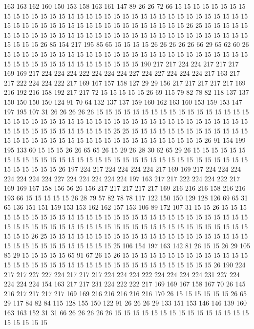 163 163 162 160 150 153 158 163 161 147 89 26 26 72 66 15 15 15 15 15
15 15 15 15 15 15 15 15 15 15 15 15 15 15 15 15 15 15 15 15
15 15 15 15 15 15 15 15 15 15 15 15 15 15 15 15 15 15 15 15
15 15 15 15 15 15 15 15 15 15 26 25 15 15 15 15 15 15 15 15
15 15 15 15 15 15 15 15 15 15 15 15 15 15 15 15 15 15 15 15
15 15 15 15 15 15 15 15 26 85 154 217 195 85 65 15 15 15 15 26
26 26 26 26 66 29 65 62 60 26 15 15 15 15 15 15 15 15 15 15
15 15 15 15 15 15 15 15 15 15 15 15 15 15 15 15 15 15 15 15
15 15 15 15 15 15 15 15 15 15 15 15 190 217 217 224 224 217 217 217
169 169 217 224 224 224 222 224 224 224 227 224 227 224 224 224 217 163 217 217
222 224 224 222 217 169 167 157 158 127 29 29 156 217 217 217 217 217 169 216
192 216 158 192 217 217 72 15 15 15 15 15 26 69 115 79 82 78 82 118
137 137 150 150 150 150 124 91 70 64 132 137 137 159 160 162 163 160 153 159
153 147 197 195 107 31 26 26 26 26 26 15 15 15 15 15 15 15 15 15
15 15 15 15 15 15 15 15 15 15 15 15 15 15 15 15 15 15 15 15
15 15 15 15 15 15 15 15 15 15 15 15 15 15 15 15 15 15 15 15
15 15 15 15 15 15 15 25 25 15 15 15 15 15 15 15 15 15 15 15
15 15 15 15 15 15 15 15 15 15 15 15 15 15 15 15 15 15 15 15
15 15 15 15 26 91 154 199 195 133 60 15 15 15 26 26 65 65 26 15
29 26 28 30 62 65 29 26 15 15 15 15 15 15 15 15 15 15 15 15
15 15 15 15 15 15 15 15 15 15 15 15 15 15 15 15 15 15 15 15
15 15 15 15 15 15 15 26 197 224 217 224 224 224 224 217 169 169 217 224
224 224 224 224 224 224 227 224 224 224 224 224 197 163 217 217 222 224 224 222
217 169 169 167 158 156 56 26 156 217 217 217 217 217 169 216 216 216 158 216
216 193 66 15 15 15 15 15 26 28 79 57 82 78 78 117 122 150 150 129
128 126 69 65 31 65 136 151 151 159 153 153 162 162 157 153 106 89 172 107
31 15 15 26 15 15 15 15 15 15 15 15 15 15 15 15 15 15 15 15
15 15 15 15 15 15 15 15 15 15 15 15 15 15 15 15 15 15 15 15
15 15 15 15 15 15 15 15 15 15 15 15 15 15 15 15 15 15 15 15
15 15 15 15 26 25 15 15 15 15 15 15 15 15 15 15 15 15 15 15
15 15 15 15 15 15 15 15 15 15 15 15 15 15 15 15 15 15 15 15
25 106 154 197 163 142 81 26 15 15 26 29 105 85 29 15 15 15 15 15
65 91 67 26 15 26 15 15 15 15 15 15 15 15 15 15 15 15 15 15
15 15 15 15 15 15 15 15 15 15 15 15 15 15 15 15 15 15 15 15
15 15 15 26 190 224 217 217 227 227 224 217 217 217 224 224 224 222 224 224
224 224 231 227 224 224 224 224 154 163 217 217 231 224 222 222 217 169 169 167
158 167 70 26 145 216 217 217 217 217 169 169 216 216 216 216 216 170 26 15
15 15 15 15 15 26 65 29 117 84 82 84 115 128 155 150 122 91 26 26
26 29 133 151 153 146 146 139 160 163 163 152 31 31 66 26 26 26 26 26
15 15 15 15 15 15 15 15 15 15 15 15 15 15 15 15 15 15 15 15
